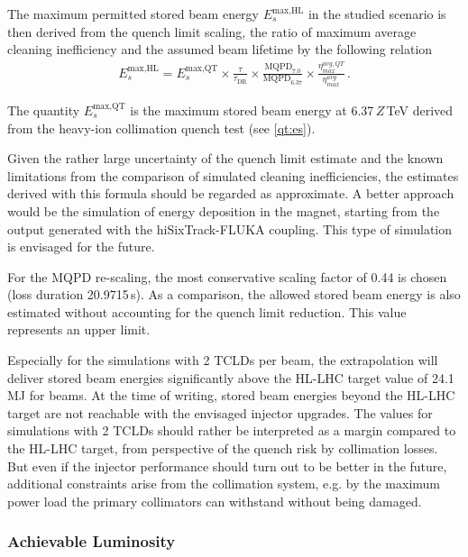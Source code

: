 \newpage
The maximum permitted stored beam energy $E_s^\text{max,HL}$ in the studied scenario is then derived from the quench limit scaling, the ratio of maximum average cleaning inefficiency and the assumed beam lifetime by the following relation
%
%
\begin{align}
  E_s^\text{max,HL} = E_s^\text{max,QT} \times \frac{\tau}{\tau_\text{DR}} \times\frac{\text{MQPD}_{7.0}}{\text{MQPD}_{6.37}} \times \frac{\eta^{avg,QT}_{max}}{\eta^{avg}_{max}} \, . \label{eq:esmaxex}
\end{align}

The quantity $E_s^\text{max,QT}$ is the maximum stored beam energy at 6.37$\,Z\,$TeV derived from the heavy-ion collimation quench test (see \eqref{qt:es}). 
\vspace{0.2cm}

Given the rather large uncertainty of the quench limit estimate and the known limitations from the comparison of simulated cleaning inefficiencies, the estimates derived with this formula should be regarded as approximate. A better approach would be the simulation of energy deposition in the magnet, starting from the output generated with the hiSixTrack-FLUKA coupling. This type of simulation is envisaged for the future. 
\vspace{0.2cm}

For the MQPD re-scaling, the most conservative scaling factor of 0.44 is chosen (loss duration 20.9715\,s). As a comparison, the allowed stored beam energy is also estimated without accounting for the quench limit reduction. This value represents an upper limit. 

\newpage
Especially for the simulations with 2 TCLDs per beam, the extrapolation will deliver stored beam energies significantly above the HL-LHC target value of 24.1\,MJ for \lead beams. At the time of writing,  stored beam energies beyond the HL-LHC target are not reachable with the envisaged injector upgrades. The values for simulations with 2 TCLDs should rather be interpreted as a margin compared to the HL-LHC target, from perspective of the quench risk by collimation losses. But even if the injector performance should turn out to be better in the future, additional constraints arise from the collimation system, e.g. by the maximum power load the primary collimators can withstand without being damaged. 

\subsubsection{Achievable Luminosity}

